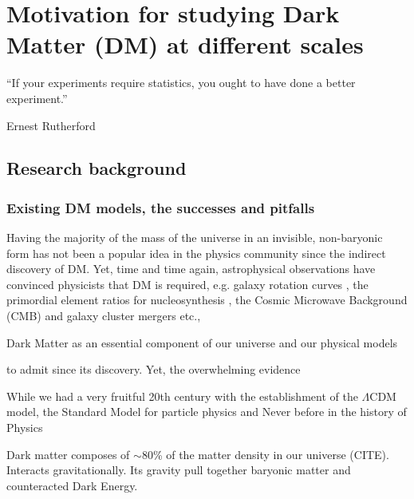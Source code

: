 \documentclass[ucdthesis.tex]{subfiles}
\begin{document}
    \doublespacing

		\chapter{Motivation for studying Dark Matter (DM) at different 
			scales}		
		\label{chapter:1}
    \epigraph{``If your experiments require statistics, you ought to have done a
		better experiment.''}{Ernest Rutherford} 

		\section{Research background}

		\subsection{Existing DM models, the successes and pitfalls}
		Having the majority of the mass of the universe in an invisible, non-baryonic form  
		has not been a popular idea in the physics community since the
		indirect discovery of DM. Yet, time and time again, astrophysical
		observations have convinced physicists that DM is required, e.g.	galaxy rotation
		curves \citep{Rubin1970}, the primordial element ratios for nucleosynthesis
		\citep{Dar1995}, 
		the Cosmic Microwave Background (CMB) and galaxy cluster mergers
		\citep{Clowe06} etc.,



		 Dark Matter as an essential component of our universe and our physical models  
		
		
		
		to admit since its discovery. 
		Yet, the overwhelming evidence  
		
		While we had a very fruitful 20th century with the
		establishment of the $\Lambda$CDM model, the Standard Model for particle
		physics and  
		Never before in the history of Physics 


		Dark matter composes of $\sim$80\% of the matter density in our universe
		(CITE). 
		Interacts gravitationally.	
		Its gravity pull together baryonic matter and counteracted 
		Dark Energy.  
\end{document}
